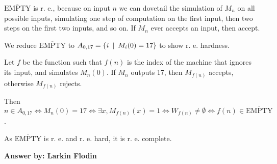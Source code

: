 \documentclass[12pt]{article}
\begin{document}
\begin{enumerate}
$\overline{\textrm{EMPTY}}$ is r. e., because on input $n$ we can dovetail the simulation of $M_n$ on all possible inputs, simulating one step of computation on the first input, then two steps on the first two inputs, and so on. If $M_n$ ever accepts an input, then accept.

We reduce $\overline{\textrm{EMPTY}}$ to $A_{0, 17} = \{ i \enskip | \enskip M_i(0) = 17 \}$ to show r. e. hardness.

Let $f$ be the function such that $f(n)$ is the index of the machine that ignores its input, and simulates $M_n(0)$. If $M_n$ outputs 17, then $M_{f(n)}$ accepts, otherwise $M_{f(n)}$ rejects.

Then $n \in A_{0, 17} \iff M_n(0) = 17 \iff \exists x, M_{f(n)}(x) = 1 \iff W_{f(n)} \neq \emptyset \iff f(n) \in \overline{\textrm{EMPTY}}$.

As $\overline{\textrm{EMPTY}}$ is r. e. and r. e. hard, it is r. e. complete.

{\bf Answer by: Larkin Flodin} 

\end{enumerate}
\end{document}
